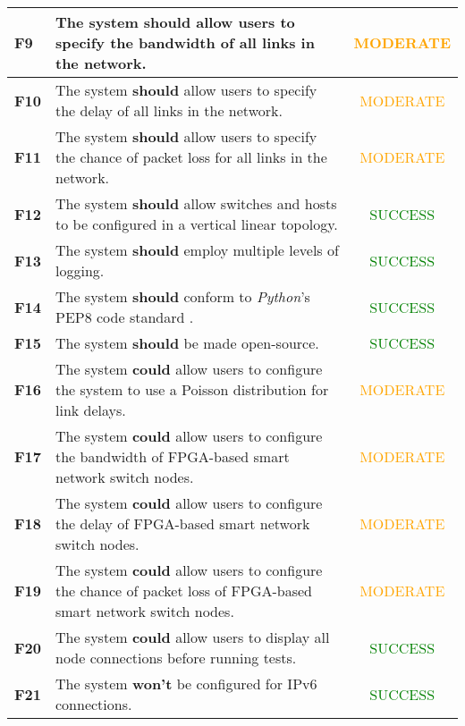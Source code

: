 \begin{center}
\begin{longtable}{|l|p{9cm}|c|}
    \textbf{F9} & The system \textbf{should} allow users to specify the bandwidth of all links in the network. & \textcolor{orange}{MODERATE} \\ \hline
    \textbf{F10} & The system \textbf{should} allow users to specify the delay of all links in the network. & \textcolor{orange}{MODERATE} \\ \hline
    \textbf{F11} & The system \textbf{should} allow users to specify the chance of packet loss for all links in the network. & \textcolor{orange}{MODERATE} \\ \hline
    \textbf{F12} & The system \textbf{should} allow switches and hosts to be configured in a vertical linear topology. & \textcolor{green}{SUCCESS} \\ \hline
    \textbf{F13} & The system \textbf{should} employ multiple levels of logging. & \textcolor{green}{SUCCESS} \\ \hline
    \textbf{F14} & The system \textbf{should} conform to \textit{Python}'s PEP8 code standard \cite{python_pep8}. & \textcolor{green}{SUCCESS} \\ \hline
    \textbf{F15} & The system \textbf{should} be made open-source. & \textcolor{green}{SUCCESS} \\ \hline
    \textbf{F16} & The system \textbf{could} allow users to configure the system to use a Poisson distribution for link delays. & \textcolor{orange}{MODERATE} \\ \hline
    \textbf{F17} & The system \textbf{could} allow users to configure the bandwidth of FPGA-based smart network switch nodes. & \textcolor{orange}{MODERATE} \\ \hline
    \textbf{F18} & The system \textbf{could} allow users to configure the delay of FPGA-based smart network switch nodes. & \textcolor{orange}{MODERATE} \\ \hline
    \textbf{F19} & The system \textbf{could} allow users to configure the chance of packet loss of FPGA-based smart network switch nodes. & \textcolor{orange}{MODERATE} \\ \hline
    \textbf{F20} & The system \textbf{could} allow users to display all node connections before running tests. & \textcolor{green}{SUCCESS} \\ \hline
    \textbf{F21} & The system \textbf{won't} be configured for IPv6 connections. & \textcolor{green}{SUCCESS} \\ \hline
  \end{longtable}
\end{center}
